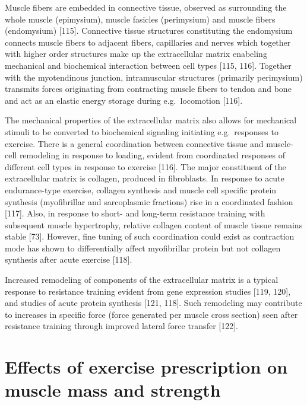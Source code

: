 \documentclass[twoside,10pt]{gihclass} %
\begin{document}
Muscle fibers are embedded in connective tissue, observed as surrounding the whole muscle (epimysium), muscle fasicles (perimysium) and muscle fibers (endomysium)
{[}115{]}.
Connective tissue structures constituting the endomysium connects muscle fibers to adjacent fibers, capillaries and nerves which together with higher order structures make up the extracellular matrix enabeling mechanical and biochemical interaction between cell types
{[}115, 116{]}.
Together with the myotendinous junction, intramuscular structures (primarily perimysium) transmits forces originating from contracting muscle fibers to tendon and bone and act as an elastic energy storage during e.g.~locomotion
{[}116{]}.

The mechanical properties of the extracellular matrix also allows for mechanical stimuli to be converted to biochemical signaling initiating e.g.~responses to exercise.
There is a general coordination between connective tissue and muscle-cell remodeling in response to loading, evident from coordinated responses of different cell types in response to exercise
{[}116{]}.
The major constituent of the extracellular matrix is collagen, produced in fibroblasts.
In response to acute endurance-type exercise, collagen synthesis and muscle cell specific protein synthesis (myofibrillar and sarcoplasmic fractions) rise in a coordinated fashion
{[}117{]}.
Also, in response to short- and long-term resistance training with subsequent muscle hypertrophy, relative collagen content of muscle tissue remains stable
{[}73{]}.
However, fine tuning of such coordination could exist as contraction mode has shown to differentially affect myofibrillar protein but not collagen synthesis after acute exercise
{[}118{]}.

Increased remodeling of components of the extracellular matrix is a typical response to resistance training evident from gene expression studies
{[}119, 120{]},
and studies of acute protein synthesis
{[}121, 118{]}.
Such remodeling may contribute to increases in specific force (force generated per muscle cross section) seen after resistance training through improved lateral force transfer
{[}122{]}.

\hypertarget{effects-of-exercise-prescription-on-muscle-mass-and-strength}{%
\section{Effects of exercise prescription on muscle mass and strength}\label{effects-of-exercise-prescription-on-muscle-mass-and-strength}}
\end{document}
